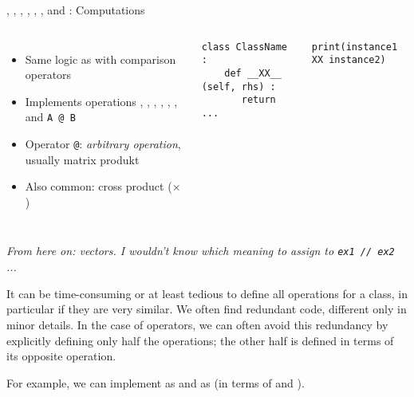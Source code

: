 \begin{frame}[fragile]{, , , , , ,  and : Computations}
%
\begin{columns}[T]
\begin{itemize}
\item Same logic as with comparison operators
\item Implements operations , , , , , ,  and \texttt{A @ B}
\item Operator \texttt{@}: \emph{arbitrary operation}, usually matrix produkt
\item Also common: cross product ($\times$)
\end{itemize}
%
\vspace{-6pt}
\begin{codebox}
\begin{verbatim}
class ClassName :
    def __XX__ (self, rhs) :
       return ...
\end{verbatim}
\end{codebox}
%
\begin{codebox}
\begin{verbatim}
print(instance1 XX instance2)
\end{verbatim}
\end{codebox}
\end{columns}

\vspace{12pt}
\emph{From here on: vectors. I wouldn't know which meaning to assign to \texttt{ex1 // ex2} ...}
%
\end{frame}


\begin{frame}
%
\begin{hintbox}
It can be time-consuming or at least tedious to define all operations for a class, in particular if they are very similar. We often find redundant code, different only in minor details. In the case of operators, we can often avoid this redundancy by explicitly defining only half the operations; the other half is defined in terms of its opposite operation.

For example, we can implement  as  and  as  (\ie in terms of  and ).
\end{hintbox}
%
\end{frame}

